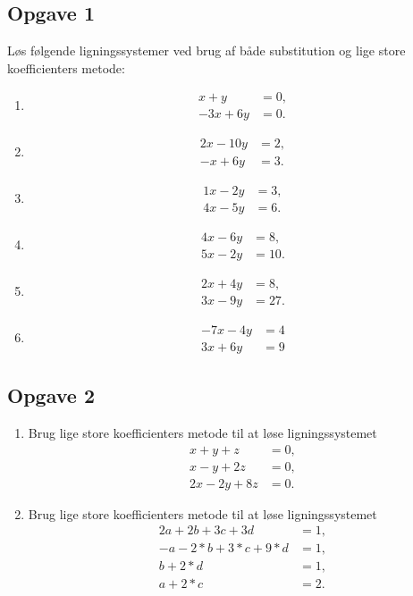 \subsection*{Opgave 1}
Løs følgende ligningssystemer ved brug af både substitution og lige store koefficienters metode:
\begin{enumerate}[label=\roman*)]
\item \begin{align*}
x+y&=0,\\
-3x+6y&=0.
\end{align*}
\item 
\begin{align*}
2x-10y&=2,\\
-x+6y&=3.
\end{align*}
\item
\begin{align*}
1x-2y&=3,\\
4x-5y&=6.
\end{align*}
\item
\begin{align*}
4x-6y&=8,\\
5x-2y&=10.
\end{align*}
\item 
\begin{align*}
2x+4y&=8,\\
3x-9y&=27.
\end{align*}
\item 
\begin{align*}
	-7x -4y &= 4 \\
	3x + 6y &= 9
\end{align*}
\end{enumerate}

\subsection*{Opgave 2}
\begin{enumerate}[label=\roman*)]
	\item Brug lige store koefficienters metode til at løse ligningssystemet
	\begin{align*}
		x+y+z&=0,\\
		x-y+2z&=0,\\
		2x-2y+8z&=0.
	\end{align*}
	\item Brug lige store koefficienters metode til at løse ligningssystemet
	\begin{align*}
		2a + 2b + 3c + 3d &= 1,\\
		-a - 2*b + 3*c + 9*d &= 1,\\
		b + 2*d &= 1,\\
		a + 2*c &= 2.
	\end{align*}
\end{enumerate}
